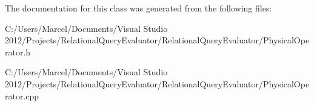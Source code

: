 The documentation for this class was generated from the following files\+:\begin{DoxyCompactItemize}
\item 
C\+:/\+Users/\+Marcel/\+Documents/\+Visual Studio 2012/\+Projects/\+Relational\+Query\+Evaluator/\+Relational\+Query\+Evaluator/Physical\+Operator.\+h\item 
C\+:/\+Users/\+Marcel/\+Documents/\+Visual Studio 2012/\+Projects/\+Relational\+Query\+Evaluator/\+Relational\+Query\+Evaluator/Physical\+Operator.\+cpp\end{DoxyCompactItemize}
